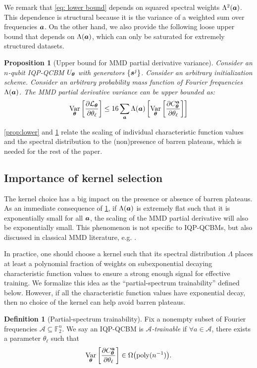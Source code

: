 \documentclass{article}
\theoremstyle{plain}
\newtheorem{proposition}[theorem]{Proposition}
\theoremstyle{definition}
\newtheorem{definition}[theorem]{Definition}
\theoremstyle{remark}
\begin{document}
We remark that \cref{eq: lower bound} depends on squared spectral weights $\Lambda^2({\bm{a}})$. This dependence is structural because it is the variance of a weighted sum over frequencies ${\bm{a}}$. On the other hand, we also provide the following loose upper bound that depends on $\Lambda({\bm{a}})$, which can only be saturated for extremely structured datasets.  
\begin{proposition}[Upper bound for MMD partial derivative variance] 
\label{prop:upper} Consider an $n$-qubit IQP-QCBM $U_{\bm{\theta}}$ with generators $\{{\bm{s}^j}\}$. Consider an arbitrary initialization scheme. Consider an arbitrary probability mass function of Fourier frequencies $\Lambda({\bm{a}})$. The MMD partial derivative variance can be upper bounded as:
\begin{equation}
    \operatorname*{Var}_{{\bm{\theta}}} \left[ \frac{\partial \mathcal{L}_{\bm{\theta}}}{\partial \theta_\ell} \right] \leq 16 \sum_{\bm{a}} \Lambda({\bm{a}})\left[  \operatorname*{Var}_{{\bm{\theta}}} \left[ \frac{\partial C^{\bm{a}}_{\bm{\theta}}}{\partial \theta_\ell} \right]\right]
\end{equation}
\end{proposition}
\cref{prop:lower} and \cref{prop:upper} relate the scaling of individual characteristic function values and the spectral distribution to the (non)presence of barren plateaus, which is needed for the rest of the paper.

\subsection{Importance of kernel selection}
\label{subsec:kernel choice}
The kernel choice has a big impact on the presence or absence of barren plateaus.
As an immediate consequence of \cref{prop:upper}, if $\Lambda({\bm{a}})$ is extremely flat such that it is exponentially small for all ${\bm{a}}$, the scaling of the MMD partial derivative will also be exponentially small. This phenomenon is not specific to IQP-QCBMs, but also discussed in classical MMD literature, e.g. \cite{gretton12}. 

In practice, one should choose a kernel such that its spectral distribution $\Lambda$ places at least a polynomial fraction of weights on subexponential decaying characteristic function values to ensure a strong enough signal for effective training. We formalize this idea as the ``partial-spectrum trainability'' defined below. However, if all the characteristic function values have exponential decay, then no choice of the kernel can help avoid barren plateaus.
\begin{definition}[Partial-spectrum trainability]
\label{def:pst}
Fix a nonempty subset of Fourier frequencies $\mathcal{A}\subseteq\mathbb{F}_2^n$.
We say an IQP-QCBM is \emph{$\mathcal{A}$-trainable} if 
$\forall a\in\mathcal{A}$, there exists a parameter $\theta_\ell$ such that
\begin{equation}
\operatorname*{Var}_{{\bm{\theta}}}\left[\frac{\partial C^{\bm{a}}_{\bm{\theta}}}{\partial \theta_\ell}\right] \in \Omega\bigl(\operatorname{poly}(n^{-1})\bigr).
\end{equation}
\end{definition}
\end{document}
